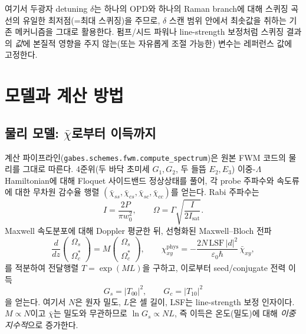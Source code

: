 \documentclass[11pt,a4paper]{article}
\begin{document}
여기서 두광자 detuning $\delta$는 하나의 OPD와 하나의 Raman branch에 대해 스퀴징
곡선의 유일한 최저점(=최대 스퀴징)을 주므로, $\delta$ 스캔 범위 안에서 최솟값을 취하는
기존 메커니즘을 그대로 활용한다. 펌프/시드 파워나 line-strength 보정처럼 스퀴징 결과의
\emph{값}에 본질적 영향을 주지 않는(또는 자유롭게 조절 가능한) 변수는 레퍼런스 값에
고정한다.

\section{모델과 계산 방법}

\subsection{물리 모델: $\bar\chi$로부터 이득까지}
계산 파이프라인(\texttt{gabes.schemes.fwm.compute\_spectrum})은 원본 FWM 코드의 물리를
그대로 따른다. 4준위(두 바닥 초미세 $G_1,G_2$, 두 들뜸 $E_2,E_3$) 이중-$\Lambda$
Hamiltonian에 대해 Floquet 사이드밴드 정상상태를 풀어, 각 probe 주파수와 속도류에 대한
무차원 감수율 행렬 $(\bar\chi_{ss},\bar\chi_{cs},\bar\chi_{sc},\bar\chi_{cc})$를 얻는다.
Rabi 주파수는
\begin{equation}
I=\frac{2P}{\pi w_0^2},\qquad
\Omega=\Gamma\sqrt{\frac{I}{2I_{\mathrm{sat}}}} .
\end{equation}
Maxwell 속도분포에 대해 Doppler 평균한 뒤, 선형화된 Maxwell--Bloch 전파
\begin{equation}
\frac{d}{dz}\begin{pmatrix}\Omega_s\\ \Omega_c^{*}\end{pmatrix}
= M\begin{pmatrix}\Omega_s\\ \Omega_c^{*}\end{pmatrix},
\qquad
\chi^{\mathrm{phys}}_{xy} = -\frac{2N\,\mathrm{LSF}\,|d|^2}{\varepsilon_0\hbar}\,\bar\chi_{xy},
\end{equation}
를 적분하여 전달행렬 $T=\exp(ML)$을 구하고, 이로부터 seed/conjugate 전력 이득
\begin{equation}
G_s=|T_{00}|^2,\qquad G_c=|T_{10}|^2
\end{equation}
을 얻는다. 여기서 $N$은 원자 밀도, $L$은 셀 길이, LSF는 line-strength 보정 인자이다.
$M\propto N$이고 $\bar\chi$는 밀도와 무관하므로 $\ln G_s\propto N L$, 즉 이득은 온도(밀도)에
대해 \emph{이중지수적}으로 증가한다.
\end{document}
